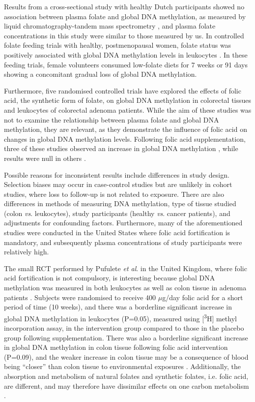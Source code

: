 \noindent Results from a cross-sectional study with healthy Dutch participants showed no association between plasma folate and global DNA methylation, as measured by liquid chromatography-tandem mass spectrometry \cite{c529}, and plasma folate concentrations in this study were similar to those measured by us. In controlled folate feeding trials with healthy, postmenopausal women, folate status was positively associated with global DNA methylation levels in leukocytes \cite{c526,c527}. In these feeding trials, female volunteers consumed low-folate diets for 7 weeks \cite{c526} or 91 days \cite{c527} showing a concomitant gradual loss of global DNA methylation.

\noindent Furthermore, five randomised controlled trials have explored the effects of folic acid, the synthetic form of folate, on global DNA methylation in colorectal tissues \cite{c533,c534,c535,c536,c552} and leukocytes \cite{c552} of colorectal adenoma patients. While the aim of these studies was not to examine the relationship between plasma folate and global DNA methylation, they are relevant, as they demonstrate the influence of folic acid on changes in global DNA methylation levels. Following folic acid supplementation, three of these studies observed an increase in global DNA methylation \cite{c533,c536,c552}, while results were null in others \cite{c534,c535}.

\noindent Possible reasons for inconsistent results include differences in study design. Selection biases may occur in case-control studies but are unlikely in cohort studies, where loss to follow-up is not related to exposure. There are also differences in methods of measuring DNA methylation, type of tissue studied (colon \emph{vs}. leukocytes), study participants (healthy \emph{vs}. cancer patients), and adjustments for confounding factors. Furthermore, many of the aforementioned studies were conducted in the United States where folic acid fortification is mandatory, and subsequently plasma concentrations of study participants were relatively high.

\noindent The small RCT performed by Pufulete \emph{et al}. in the United Kingdom, where folic acid fortification is not compulsory, is interesting because global DNA methylation was measured in both leukocytes as well as colon tissue in adenoma patients \cite{c552}. Subjects were randomised to receive 400 $\mu$g/day folic acid for a short period of time (10 weeks), and there was a borderline significant increase in global DNA methylation in leukocytes (P=0.05), measured using [\textsuperscript{3}H] methyl incorporation assay, in the intervention group compared to those in the placebo group following supplementation. There was also a borderline significant increase in global DNA methylation in colon tissue following folic acid intervention (P=0.09), and the weaker increase in colon tissue may be a consequence of blood being ``closer'' than colon tissue to environmental exposures \cite{c553}. Additionally, the absorption and metabolism of natural folates and synthetic folates, i.e. folic acid, are different, and may therefore have dissimilar effects on one carbon metabolism \cite{c554,c555}.

